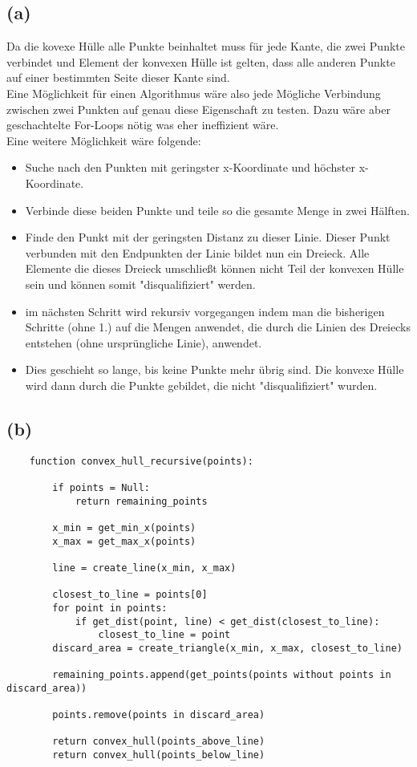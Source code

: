 \documentclass[a4paper]{scrartcl}
\newcounter{punkte}
\begin{document}
\subsection*{(a)}
Da die kovexe Hülle alle Punkte beinhaltet muss für jede Kante, die zwei Punkte verbindet und Element der konvexen Hülle ist gelten, dass alle anderen Punkte auf einer bestimmten Seite dieser Kante sind.\\
Eine Möglichkeit für einen Algorithmus wäre also jede Mögliche Verbindung zwischen zwei Punkten auf genau diese Eigenschaft zu testen. Dazu wäre aber geschachtelte For-Loops nötig was eher ineffizient wäre.\\
Eine weitere Möglichkeit wäre folgende:\\
\begin{itemize}
	\item Suche nach den Punkten mit geringster x-Koordinate und höchster x-Koordinate.
	\item Verbinde diese beiden Punkte und teile so die gesamte Menge in zwei Hälften.
	\item Finde den Punkt mit der geringsten Distanz zu dieser Linie. Dieser Punkt verbunden mit den Endpunkten der Linie bildet nun ein Dreieck. Alle Elemente die dieses Dreieck umschließt können nicht Teil der konvexen Hülle sein und können somit "disqualifiziert" werden.
	\item im nächsten Schritt wird rekursiv vorgegangen indem man die bisherigen Schritte (ohne 1.) auf die Mengen anwendet, die durch die Linien des Dreiecks entstehen (ohne ursprüngliche Linie), anwendet.
	\item Dies geschieht so lange, bis keine Punkte mehr übrig sind. Die konvexe Hülle wird dann durch die Punkte gebildet, die nicht "disqualifiziert" wurden.
\end{itemize}


\subsection*{(b)}
\begin{lstlisting}
	function convex_hull_recursive(points):
		
		if points = Null:
			return remaining_points
			
		x_min = get_min_x(points)
		x_max = get_max_x(points)
		
		line = create_line(x_min, x_max)
		
		closest_to_line = points[0]
		for point in points:
			if get_dist(point, line) < get_dist(closest_to_line):
				closest_to_line = point
		discard_area = create_triangle(x_min, x_max, closest_to_line)
		
		remaining_points.append(get_points(points without points in discard_area))
		
		points.remove(points in discard_area)
		
		return convex_hull(points_above_line)
		return convex_hull(points_below_line)
\end{lstlisting}
\end{document}
